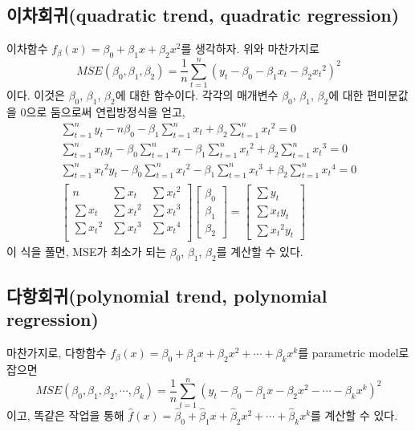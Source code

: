 \documentclass{article}
\begin{document}
\subsection{이차회귀(quadratic trend, quadratic regression)}
이차함수 \(f_\beta(x)=\beta_0+\beta_1x+\beta_2x^2\)를 생각하자.
위와 마찬가지로
\[MSE(\beta_0,\beta_1,\beta_2)=\frac1n\sum_{t=1}^n(y_t-\beta_0-\beta_1{x_t}-\beta_2{x_t}^2)^2\]
이다.
이것은 \(\beta_0\), \(\beta_1\), \(\beta_2\)에 대한 함수이다.
각각의 매개변수 \(\beta_0\), \(\beta_1\), \(\beta_2\)에 대한 편미분값을 0으로 둠으로써 연립방정식을 얻고,
\begin{gather*}
\sum_{t=1}^ny_t-n\beta_0-\beta_1\sum_{t=1}^nx_t+\beta_2\sum_{t=1}^n{x_t}^2=0\\
\sum_{t=1}^nx_ty_t-\beta_0\sum_{t=1}^nx_t-\beta_1\sum_{t=1}^n{x_t}^2+\beta_2\sum_{t=1}^n{x_t}^3=0\\
\sum_{t=1}^n{x_t}^2y_t-\beta_0\sum_{t=1}^n{x_t}^2-\beta_1\sum_{t=1}^n{x_t}^3+\beta_2\sum_{t=1}^n{x_t}^4=0\\
\begin{bmatrix}
n&\sum x_t&\sum{x_t}^2\\
\sum x_t&\sum{x_t}^2&\sum{x_t}^3\\
\sum{x_t}^2&\sum{x_t}^3&\sum{x_t}^4\\
\end{bmatrix}
\begin{bmatrix}
\beta_0\\\beta_1\\\beta_2
\end{bmatrix}
=
\begin{bmatrix}
\sum y_t\\\sum x_ty_t\\\sum{x_t}^2y_t
\end{bmatrix}
\end{gather*}
이 식을 풀면, MSE가 최소가 되는 \(\beta_0\), \(\beta_1\), \(\beta_2\)를 계산할 수 있다.

\subsection{다항회귀(polynomial trend, polynomial regression)}
마찬가지로, 다항함수 \(f_\beta(x)=\beta_0+\beta_1x+\beta_2x^2+\cdots+\beta_kx^k\)를 parametric model로 잡으면
\[MSE(\beta_0,\beta_1,\beta_2,\cdots,\beta_k)=\frac1n\sum_{t=1}^n(y_t-\beta_0-\beta_1x-\beta_2x^2-\cdots-\beta_kx^k)^2\]
이고, 똑같은 작업을 통해 \(\hat f(x)=\hat \beta_0+\hat \beta_1x+\hat \beta_2x^2+\cdots+\hat \beta_kx^k\)를 계산할 수 있다.
\end{document}
